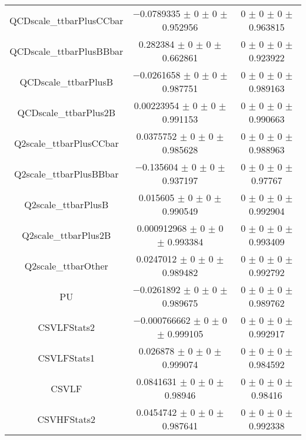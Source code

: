 \begin{table}
\begin{tabular}{ccc}
QCDscale\_ttbarPlusCCbar 	& \num{-0.0789335} $\pm$ \num{0} $\pm$ \num{0} $\pm$ \num{0.952956} 	& \num{0} $\pm$ \num{0} $\pm$ \num{0} $\pm$ \num{0.963815}\\
QCDscale\_ttbarPlusBBbar 	& \num{0.282384} $\pm$ \num{0} $\pm$ \num{0} $\pm$ \num{0.662861} 	& \num{0} $\pm$ \num{0} $\pm$ \num{0} $\pm$ \num{0.923922}\\
QCDscale\_ttbarPlusB 	& \num{-0.0261658} $\pm$ \num{0} $\pm$ \num{0} $\pm$ \num{0.987751} 	& \num{0} $\pm$ \num{0} $\pm$ \num{0} $\pm$ \num{0.989163}\\
QCDscale\_ttbarPlus2B 	& \num{0.00223954} $\pm$ \num{0} $\pm$ \num{0} $\pm$ \num{0.991153} 	& \num{0} $\pm$ \num{0} $\pm$ \num{0} $\pm$ \num{0.990663}\\
Q2scale\_ttbarPlusCCbar 	& \num{0.0375752} $\pm$ \num{0} $\pm$ \num{0} $\pm$ \num{0.985628} 	& \num{0} $\pm$ \num{0} $\pm$ \num{0} $\pm$ \num{0.988963}\\
Q2scale\_ttbarPlusBBbar 	& \num{-0.135604} $\pm$ \num{0} $\pm$ \num{0} $\pm$ \num{0.937197} 	& \num{0} $\pm$ \num{0} $\pm$ \num{0} $\pm$ \num{0.97767}\\
Q2scale\_ttbarPlusB 	& \num{0.015605} $\pm$ \num{0} $\pm$ \num{0} $\pm$ \num{0.990549} 	& \num{0} $\pm$ \num{0} $\pm$ \num{0} $\pm$ \num{0.992904}\\
Q2scale\_ttbarPlus2B 	& \num{0.000912968} $\pm$ \num{0} $\pm$ \num{0} $\pm$ \num{0.993384} 	& \num{0} $\pm$ \num{0} $\pm$ \num{0} $\pm$ \num{0.993409}\\
Q2scale\_ttbarOther 	& \num{0.0247012} $\pm$ \num{0} $\pm$ \num{0} $\pm$ \num{0.989482} 	& \num{0} $\pm$ \num{0} $\pm$ \num{0} $\pm$ \num{0.992792}\\
PU 	& \num{-0.0261892} $\pm$ \num{0} $\pm$ \num{0} $\pm$ \num{0.989675} 	& \num{0} $\pm$ \num{0} $\pm$ \num{0} $\pm$ \num{0.989762}\\
CSVLFStats2 	& \num{-0.000766662} $\pm$ \num{0} $\pm$ \num{0} $\pm$ \num{0.999105} 	& \num{0} $\pm$ \num{0} $\pm$ \num{0} $\pm$ \num{0.992917}\\
CSVLFStats1 	& \num{0.026878} $\pm$ \num{0} $\pm$ \num{0} $\pm$ \num{0.999074} 	& \num{0} $\pm$ \num{0} $\pm$ \num{0} $\pm$ \num{0.984592}\\
CSVLF 	& \num{0.0841631} $\pm$ \num{0} $\pm$ \num{0} $\pm$ \num{0.98946} 	& \num{0} $\pm$ \num{0} $\pm$ \num{0} $\pm$ \num{0.98416}\\
CSVHFStats2 	& \num{0.0454742} $\pm$ \num{0} $\pm$ \num{0} $\pm$ \num{0.987641} 	& \num{0} $\pm$ \num{0} $\pm$ \num{0} $\pm$ \num{0.992338}\\

\end{tabular}
\end{table}
